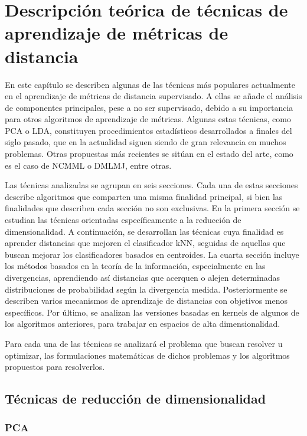 \chapter{Descripción teórica de técnicas de aprendizaje de métricas de distancia}

En este capítulo se describen algunas de las técnicas más populares actualmente en el aprendizaje de métricas de distancia supervisado. A ellas se añade el análisis de componentes principales, pese a no ser supervisado, debido a su importancia para otros algoritmos de aprendizaje de métricas. Algunas estas técnicas, como PCA o LDA, constituyen procedimientos estadísticos desarrollados a finales del siglo pasado, que en la actualidad siguen siendo de gran relevancia en muchos problemas. Otras propuestas más recientes se sitúan en el estado del arte, como es el caso de NCMML o DMLMJ, entre otras.

Las técnicas analizadas se agrupan en seis secciones. Cada una de estas secciones describe algoritmos que comparten una misma finalidad principal, si bien las finalidades que describen cada sección no son exclusivas. En la primera sección se estudian las técnicas orientadas específicamente a la reducción de dimensionalidad. A continuación, se desarrollan las técnicas cuya finalidad es aprender distancias que mejoren el clasificador kNN, seguidas de aquellas que buscan mejorar los clasificadores basados en centroides. La cuarta sección incluye los métodos basados en la teoría de la información, especialmente en las divergencias, aprendiendo así distancias que acerquen o alejen determinadas distribuciones de probabilidad según la divergencia medida. Posteriormente se describen varios mecanismos de aprendizaje de distancias con objetivos menos específicos. Por último, se analizan las versiones basadas en kernels de algunos de los algoritmos anteriores, para trabajar en espacios de alta dimensionalidad.

Para cada una de las técnicas se analizará el problema que buscan resolver u optimizar, las formulaciones matemáticas de dichos problemas y los algoritmos propuestos para resolverlos.

\section{Técnicas de reducción de dimensionalidad}

\subsection{PCA}

